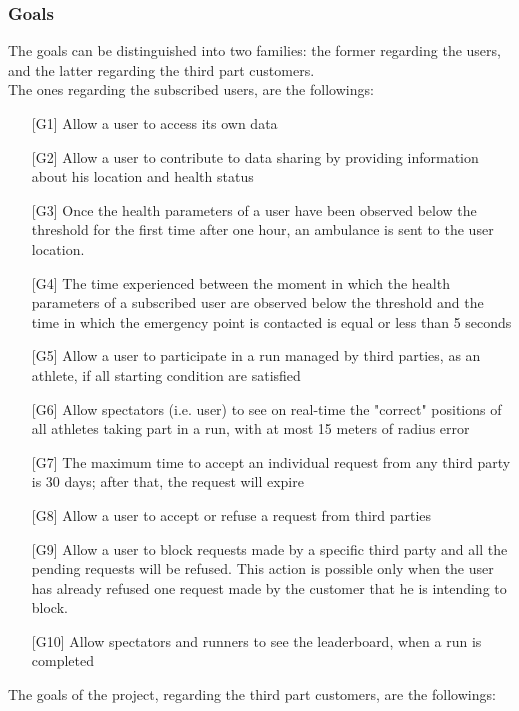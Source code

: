 \subsubsection{Goals}
The goals can be distinguished into two families: the former regarding the users, and the latter regarding the third part customers.\\
The ones regarding the subscribed users, are the followings:
\begin{enumerate}
\item[{[G1]}] Allow a user to access its own data
\item[{[G2]}] Allow a user to contribute to data sharing by providing information about his location and health status
\item[{[G3]}] Once the health parameters of a user have been observed 
below the threshold for the first time after one hour, an ambulance is sent to the user location. 
\item[{[G4]}] The time experienced between the moment in which the health parameters of a subscribed user are observed below the threshold and the time in which the emergency point is contacted is equal or less than 5 seconds
\item[{[G5]}] Allow a user to participate in a run managed by third parties, as an athlete, if all starting condition are satisfied
\item[{[G6]}] Allow spectators (i.e. user) to see on real-time the "correct" positions of all athletes taking part in a run, with at most 15 meters of radius error
\item[{[G7]}] The maximum time to accept an individual request from any third party is 30 days; after that, the request will expire
\item[{[G8]}] Allow a user to accept or refuse a request from third parties
\item[{[G9]}] Allow a user to block requests made by a specific third party and all the pending requests will be refused. This action is possible only when the user has already refused one request made
by the customer that he is intending to block.
\item[{[G10]}] Allow spectators and runners to see the leaderboard, when a run is completed
\end{enumerate}
The goals of the project, regarding the third part customers, are the followings:
